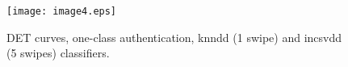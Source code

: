 \documentclass[referee]{raa}            %
\begin{document}
\begin{figure}
   \centering
   \texttt{[image: image4.eps]}
   \caption{DET curves, one-class authentication, knndd (1 swipe) and incsvdd (5 swipes) classifiers.}
   \label{Fig4}
   \end{figure}

\label{lastpage}
\end{document}
